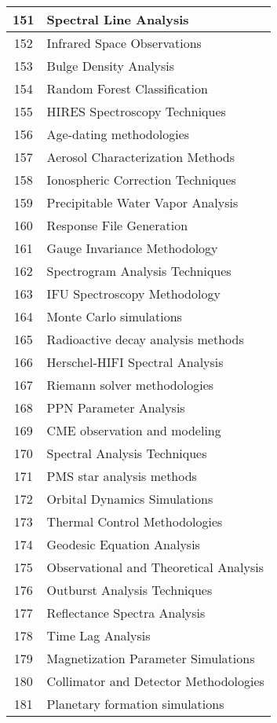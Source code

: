 \begin{table}[htbp]
\begin{tabular}{|c|l|}
\hline
151 & Spectral Line Analysis \\
\hline
152 & Infrared Space Observations \\
\hline
153 & Bulge Density Analysis \\
\hline
154 & Random Forest Classification \\
\hline
155 & HIRES Spectroscopy Techniques \\
\hline
156 & Age-dating methodologies \\
\hline
157 & Aerosol Characterization Methods \\
\hline
158 & Ionospheric Correction Techniques \\
\hline
159 & Precipitable Water Vapor Analysis \\
\hline
160 & Response File Generation \\
\hline
161 & Gauge Invariance Methodology \\
\hline
162 & Spectrogram Analysis Techniques \\
\hline
163 & IFU Spectroscopy Methodology \\
\hline
164 & Monte Carlo simulations \\
\hline
165 & Radioactive decay analysis methods \\
\hline
166 & Herschel-HIFI Spectral Analysis \\
\hline
167 & Riemann solver methodologies \\
\hline
168 & PPN Parameter Analysis \\
\hline
169 & CME observation and modeling \\
\hline
170 & Spectral Analysis Techniques \\
\hline
171 & PMS star analysis methods \\
\hline
172 & Orbital Dynamics Simulations \\
\hline
173 & Thermal Control Methodologies \\
\hline
174 & Geodesic Equation Analysis \\
\hline
175 & Observational and Theoretical Analysis \\
\hline
176 & Outburst Analysis Techniques \\
\hline
177 & Reflectance Spectra Analysis \\
\hline
178 & Time Lag Analysis \\
\hline
179 & Magnetization Parameter Simulations \\
\hline
180 & Collimator and Detector Methodologies \\
\hline
181 & Planetary formation simulations \\

\end{tabular}
\end{table}
